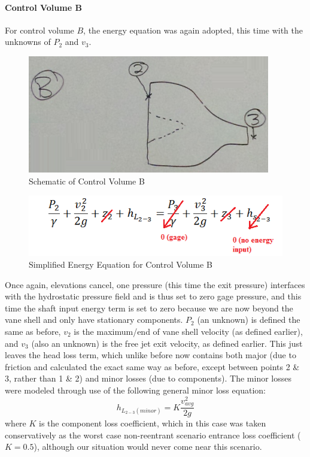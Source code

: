 \documentclass{report}
\begin{document}
\paragraph{Control Volume B}\par
For control volume $B$, the energy equation was again adopted, this time with the unknowns of $P_2$ and $v_3$.
\begin{figure}[H]
\centering
\includegraphics{"Control Volume B"}
\caption{Schematic of Control Volume B}
\end{figure}
\begin{figure}[H]
\centering
\includegraphics{"Eqn B"}
\caption{Simplified Energy Equation for Control Volume B}
\end{figure}
Once again, elevations cancel, one pressure (this time the exit pressure) interfaces with the hydrostatic pressure field and is thus set to zero gage pressure, and this time the shaft input energy term is set to zero because we are now beyond the vane shell and only have stationary components.  $P_2$ (an unknown) is defined the same as before, $v_2$ is the maximum/end of vane shell velocity (as defined earlier), and $v_3$ (also an unknown) is the free jet exit velocity, as defined earlier.  This just leaves the head loss term, which unlike before now contains both major (due to friction and calculated the exact same way as before, except between points 2 \& 3, rather than 1 \& 2) and minor losses (due to components).  The minor losses were modeled through use of the following general minor loss equation:
\begin{equation}
h_{L_{2-3}(minor)}=K\frac{v_{avg}^2}{2g}
\end{equation}
where $K$ is the component loss coefficient, which in this case was taken conservatively as the worst case non-reentrant scenario entrance loss coefficient ($K=0.5$), although our situation would never come near this scenario.
\end{document}
